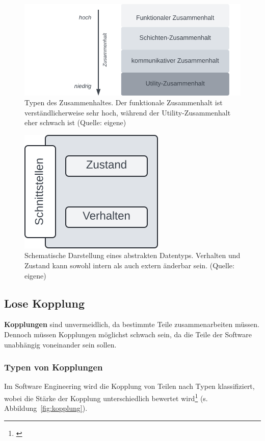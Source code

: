 \begin{figure}
    \centering
    \includegraphics[scale=0.4]{part two/Objektorientierter Entwurf/img/zusammenhalt}
    \caption{Typen des Zusammenhaltes. Der funktionale Zusammenhalt ist verständlicherweise sehr hoch, während der Utility-Zusammenhalt eher schwach ist (Quelle: eigene)}
    \label{fig:zusammenhalt}
\end{figure}


\begin{figure}
    \centering
    \includegraphics[scale=0.4]{part two/Objektorientierter Entwurf/img/adt}
    \caption{Schematische Darstellung eines abstrakten Datentyps. Verhalten und Zustand kann sowohl intern als auch extern änderbar sein.  (Quelle: eigene)}
    \label{fig:adt}
\end{figure}

\subsection{Lose Kopplung}
\textbf{Kopplungen} sind unvermeidlich, da bestimmte Teile zusammenarbeiten müssen.\\
Dennoch müssen Kopplungen möglichst schwach sein, da die Teile der Software unabhängig voneinander sein sollen.

\subsubsection*{Typen von Kopplungen}
Im Software Engineering wird die Kopplung von Teilen nach Typen klassifiziert, wobei die Stärke der Kopplung unterschiedlich bewertet wird\footnote{
\cite[33 ff.]{Mye75}
} (s. Abbildung~\ref{fig:kopplung}).

